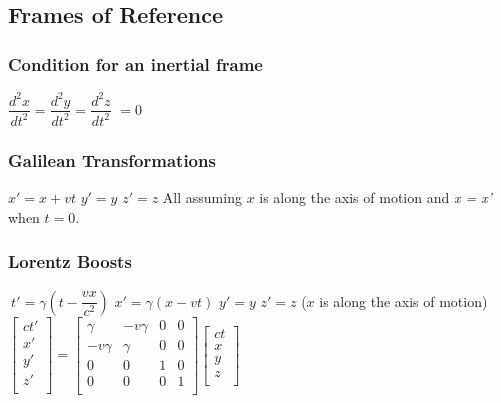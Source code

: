 \subsection{Frames of Reference}		

\subsubsection{Condition for an inertial frame}	
\begin{itemize}
\itemt \( \dfrac{d^2 x}{dt^2} = \dfrac{d^2 y}{dt^2} = \dfrac{d^2 z}{dt^2} \) \normalsize \(= 0\)
\end{itemize}		 

\subsubsection[GT]{Galilean Transformations}				 
\begin{itemize}
\itemt \(x' = x + vt\)
\itemt \(y' = y\)
\itemt \(z' = z\)
\itemt All assuming $x$ is along the axis of motion and \textit{x = x'} when $t = 0$.	
\end{itemize}

\subsubsection{Lorentz Boosts}				
\begin{itemize}
\itemt \( \ t' = \gamma (t-\dfrac{vx}{c^2})\)
\itemt \( x' = \gamma (x-vt)\)
\itemt \( y' = y \)
\itemt \( z' = z \)
\itemt ($x$ is along the axis of motion)					
\itemt \(					
\begin{bmatrix}
ct' \\
x' \\
y' \\
z' \\
\end{bmatrix} =
\begin{bmatrix}
\gamma 		&-v\gamma	&0	&0 	\\
-v\gamma 	&\gamma		&0	&0	\\
0 			&0			&1	&0	\\
0 			&0			&0	&1	\\
\end{bmatrix}
\begin{bmatrix}
ct \\
x \\
y \\
z \\
\end{bmatrix} \)
\end{itemize}		

